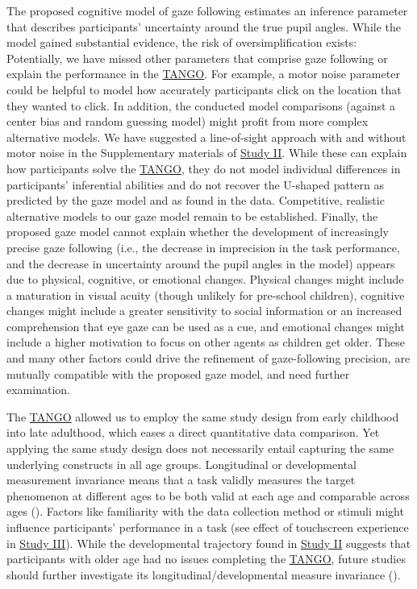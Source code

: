\documentclass[
]{scrbook}
\begin{document}
The proposed cognitive model of gaze following estimates an inference parameter that describes participants' uncertainty around the true pupil angles. While the model gained substantial evidence, the risk of oversimplification exists: Potentially, we have missed other parameters that comprise gaze following or explain the performance in the \hyperref[acronyms_TANGO]{TANGO}. For example, a motor noise parameter could be helpful to model how accurately participants click on the location that they wanted to click. In addition, the conducted model comparisons (against a center bias and random guessing model) might profit from more complex alternative models. We have suggested a line-of-sight approach with and without motor noise in the Supplementary materials of \hyperref[studyII]{Study II}. While these can explain how participants solve the \hyperref[acronyms_TANGO]{TANGO}, they do not model individual differences in participants' inferential abilities and do not recover the U-shaped pattern as predicted by the gaze model and as found in the data. Competitive, realistic alternative models to our gaze model remain to be established. Finally, the proposed gaze model cannot explain whether the development of increasingly precise gaze following (i.e., the decrease in imprecision in the task performance, and the decrease in uncertainty around the pupil angles in the model) appears due to physical, cognitive, or emotional changes. Physical changes might include a maturation in visual acuity (though unlikely for pre-school children), cognitive changes might include a greater sensitivity to social information or an increased comprehension that eye gaze can be used as a cue, and emotional changes might include a higher motivation to focus on other agents as children get older. These and many other factors could drive the refinement of gaze-following precision, are mutually compatible with the proposed gaze model, and need further examination.

The \hyperref[acronyms_TANGO]{TANGO} allowed us to employ the same study design from early childhood into late adulthood, which eases a direct quantitative data comparison. Yet applying the same study design does not necessarily entail capturing the same underlying constructs in all age groups. Longitudinal or developmental measurement invariance means that a task validly measures the target phenomenon at different ages to be both valid at each age and comparable across ages (). Factors like familiarity with the data collection method or stimuli might influence participants' performance in a task (see effect of touchscreen experience in \hyperref[studyIII]{Study III}). While the developmental trajectory found in \hyperref[studyII]{Study II} suggests that participants with older age had no issues completing the \hyperref[acronyms_TANGO]{TANGO}, future studies should further investigate its longitudinal/developmental measure invariance ().
\end{document}
